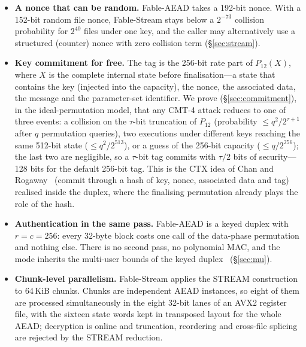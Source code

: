 \documentclass{iacrtrans}
\newcommand{\FableAEAD}{\textsf{Fable-AEAD}\xspace}
\newcommand{\FableStream}{\textsf{Fable-Stream}\xspace}
\newcommand{\PP}[1]{P_{#1}}
\begin{document}
\begin{itemize}
\item \textbf{A nonce that can be random.} \FableAEAD takes a 192-bit nonce. With a 152-bit random file nonce, \FableStream stays below a $2^{-73}$ collision probability for $2^{40}$ files under one key, and the caller may alternatively use a structured (counter) nonce with zero collision term (\S\ref{sec:stream}).
\item \textbf{Key commitment for free.} The tag is the 256-bit rate part of $\PP{12}(X)$, where $X$ is the complete internal state before finalisation---a state that contains the key (injected into the capacity), the nonce, the associated data, the message and the parameter-set identifier. We prove (\S\ref{sec:commitment}), in the ideal-permutation model, that any CMT-4 attack reduces to one of three events: a collision on the $\tau$-bit truncation of $\PP{12}$ (probability $\leq q^2/2^{\tau+1}$ after $q$ permutation queries), two executions under different keys reaching the same 512-bit state ($\leq q^2/2^{513}$), or a guess of the 256-bit capacity ($\leq q/2^{256}$); the last two are negligible, so a $\tau$-bit tag commits with $\tau/2$ bits of security---128 bits for the default 256-bit tag. This is the CTX idea of Chan and Rogaway~\cite{CR22} (commit through a hash of key, nonce, associated data and tag) realised inside the duplex, where the finalising permutation already plays the role of the hash.
\item \textbf{Authentication in the same pass.} \FableAEAD is a keyed duplex with $r=c=256$: every 32-byte block costs one call of the data-phase permutation and nothing else. There is no second pass, no polynomial MAC, and the mode inherits the multi-user bounds of the keyed duplex~\cite{JLM14,DMV17} (\S\ref{sec:mu}).
\item \textbf{Chunk-level parallelism.} \FableStream applies the STREAM construction~\cite{HRRV15} to 64\,KiB chunks. Chunks are independent AEAD instances, so eight of them are processed simultaneously in the eight 32-bit lanes of an AVX2 register file, with the sixteen state words kept in transposed layout for the whole AEAD; decryption is online and truncation, reordering and cross-file splicing are rejected by the STREAM reduction.
\end{itemize}
\end{document}
